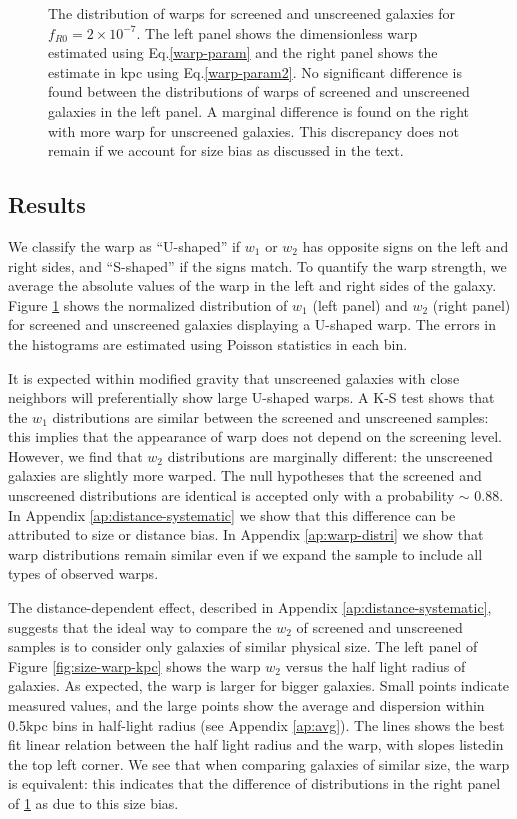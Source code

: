 \documentclass[twocolappendix, numberedappendix]{emulateapj}
\begin{document}
\begin{figure}
\begin{center}
\caption{ The distribution of warps for screened and unscreened galaxies for
$f_{R0} = 2\times10^{-7}$.
The left panel shows the dimensionless warp estimated using 
Eq.\ref{warp-param} and the  right panel shows the estimate in kpc using   
  Eq.\ref{warp-param2}. No significant difference is found
between the distributions of warps of  screened and unscreened galaxies in 
the left panel. A marginal difference is found on the right with more warp
for unscreened galaxies. This discrepancy does not remain if we account for size
bias as discussed in the text.}
\label{fig:warp-distr}
\end{center}
\end{figure}

\subsection{Results}
We classify the warp as ``U-shaped'' if $w_1$ or $w_2$ has opposite signs on
the left
and right sides, and ``S-shaped'' if the signs match.
To quantify the warp strength, we average the absolute values of the
warp in the left and right sides of the galaxy.
Figure \ref{fig:warp-distr} shows the normalized distribution of $w_1$ 
(left panel) and $w_2$ (right panel) 
for screened and unscreened galaxies displaying a
U-shaped warp. The errors in the histograms are estimated using Poisson
statistics in each bin.

It is expected within modified gravity that unscreened galaxies with
close neighbors will preferentially show large U-shaped warps.
A K-S test shows that the $w_1$ distributions are similar between the
screened and unscreened samples: this implies that the appearance of
warp does not depend on the screening level.
However, we find that $w_2$ distributions are
marginally different: the unscreened galaxies are slightly more warped. The
null hypotheses that the screened and unscreened distributions are identical is
accepted only with a probability $\sim$ 0.88.
In Appendix \ref{ap:distance-systematic} we show that this difference can be
attributed to size or
distance bias. In Appendix \ref{ap:warp-distri} we show that
warp distributions remain similar even if we expand the sample to include
all types of observed warps.

The distance-dependent effect, described in Appendix
\ref{ap:distance-systematic}, suggests that the ideal way to
compare the $w_2$ of screened and unscreened samples is to consider
only galaxies of similar physical size.
The left panel of Figure \ref{fig:size-warp-kpc} shows the
warp $w_2$ versus the half light radius of galaxies. As expected, the
warp is larger for bigger galaxies. Small points indicate measured
values, and the large points show the average and dispersion within
0.5kpc bins in half-light radius (see Appendix \ref{ap:avg}).
The lines shows the best fit linear relation between the
half light radius and the warp, with slopes listedin the top left corner.
We see that when comparing galaxies of similar size, the warp is
equivalent: this indicates that the difference of distributions in the
right panel of \ref{fig:warp-distr} as due to this size bias. 
\end{document}
